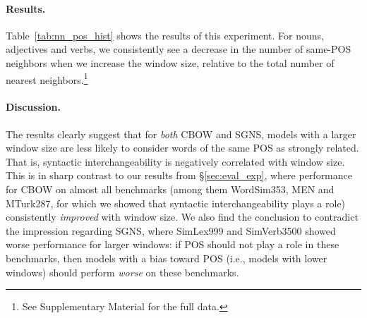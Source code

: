 \documentclass[11pt,a4paper]{article}
\begin{document}
    \paragraph{Results.}
    
    Table~\ref{tab:nn_pos_hist} shows the results of this experiment.
    For nouns, adjectives and verbs, we consistently see a decrease in
    the  number of same-POS neighbors when we increase the window size,
    relative to the total number of nearest
    neighbors.\footnote{See Supplementary Material for the full data.}
    
    \paragraph{Discussion.}
    
    The results clearly suggest that for \textit{both} CBOW and SGNS,
    models with a larger window size are less likely to consider words
    of the same POS as strongly related.
    That is, syntactic interchangeability is negatively correlated with window size.
    This is in sharp contrast to our results from \S\ref{sec:eval_exp},
    where performance for CBOW on almost all benchmarks
    (among them  WordSim353, MEN and MTurk287, for which we showed that
    syntactic interchangeability plays a role) consistently
    \textit{improved} with window size.
    We also find the conclusion to contradict the impression regarding SGNS,
    where SimLex999 and SimVerb3500 showed worse performance for larger windows:
    if POS should not play a role in these benchmarks,
    then models with a bias toward POS (i.e., models with lower windows)
    should perform \textit{worse} on these benchmarks.
    
\end{document}
